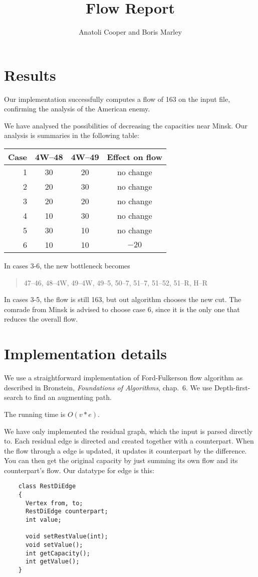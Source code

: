 \documentclass{tufte-handout}
\title{Flow Report}
\author{Anatoli Cooper and Boris Marley}
\begin{document}
  \maketitle

  \section{Results}

  Our implementation successfully computes a flow of 163 on the input file, confirming the analysis of the American enemy.

  We have analysed the possibilities of decreasing the capacities near Minsk.
  Our analysis is summaries in the following table:

\bigskip
  \begin{tabular}{rccc}\toprule
    Case & 4W--48 & 4W--49 & Effect on flow \\\midrule
    1& 30& 20 & no change \\
    2& 20& 30 & no change \\
    3& 20& 20 & no change \\
    4& 10& 30 & no change \\
    5& 30& 10 & no change \\
    6& 10& 10 & $-20$ \\\bottomrule
  \end{tabular}
  \bigskip

  In cases 3-6, the new bottleneck becomes
  \begin{quote}
      47--46, 48--4W, 49--4W, 49--5, 50--7, 51--7, 51--52, 51--R, H--R
  \end{quote}
  In cases 3-5, the flow is still 163, but out algorithm chooses the new cut.
  The comrade from Minsk is advised to choose case 6, since it is the only one that reduces the overall flow.

  \section{Implementation details}

  We use a straightforward implementation of Ford-Fulkerson flow algorithm as described in Bronstein, \emph{Foundations of Algorithms}, chap.~6.
  We use Depth-first-search to find an augmenting path.

  The running time is $O(v*e)$.

  We have only implemented the residual graph, which the input is parsed directly to. Each residual edge is directed and created together with a counterpart. When the flow through a edge is updated, it updates it counterpart by the difference. You can then get the original capacity by just summing its own flow and its counterpart's flow.
  Our datatype for edge is this:
  \begin{verbatim}
    class RestDiEdge
    {
      Vertex from, to;
      RestDiEdge counterpart;
      int value;
      
      void setRestValue(int);
      void setValue();
      int getCapacity();
      int getValue(); 
    }
  \end{verbatim}


\end{document}

